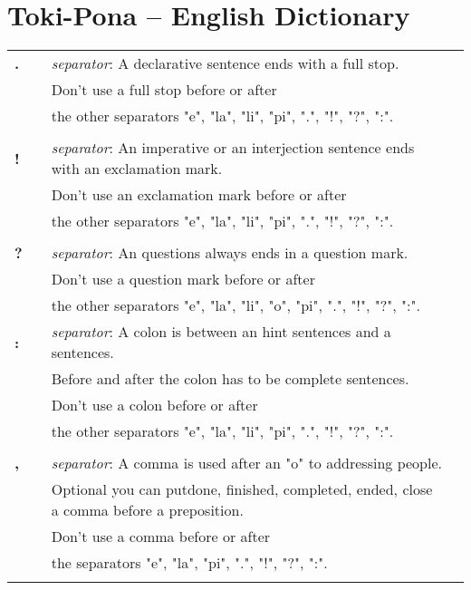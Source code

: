\section{Toki-Pona -- English Dictionary}
\label{'dict'}
%
\begin{supertabular}{p{2,5cm}|ll}
\textbf{.} && \textit{separator}: A declarative sentence ends with a full stop. \\ && Don't use a full stop before or after \\ && the other separators "e", "la", "li", "pi", ".", "!", "?", ":". \\ 
 && \\ %
\textbf{!} && \textit{separator}: An imperative or an interjection sentence ends with an exclamation mark. \\ && Don't use an exclamation mark before or after \\ && the other separators "e", "la", "li", "pi", ".", "!", "?", ":".  \\ 
 && \\ %
\textbf{?} && \textit{separator}: An questions always ends in a question mark. \\ && Don't use a question mark before or after \\ && the other separators "e", "la", "li", "o", "pi", ".", "!", "?", ":". 
 && \\ %
\textbf{:} && \textit{separator}: A colon is between an hint sentences and a sentences. \\  && Before and after the colon has to be complete sentences.  \\  && Don't use a colon before or after \\ && the other separators "e", "la", "li", "pi", ".", "!", "?", ":".       \\ 
 && \\ %
\textbf{,} && \textit{separator}: A comma is used after an "o" to addressing people. \\ &&  Optional you can putdone, finished, completed, ended, close a comma before a preposition. \\ && Don't use a comma before or after \\ && the separators "e", "la", "pi", ".", "!", "?", ":".       \\ 
 && \\ %

\end{supertabular}
